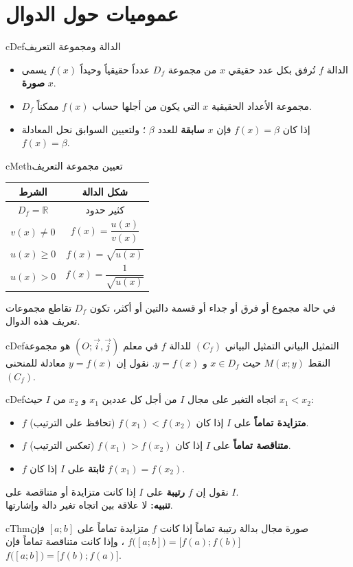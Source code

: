 \documentclass[12pt,a4paper]{article}
\newenvironment{BOX}[2]{\begin{otherlanguage}{english}\begin{arbox}{#1}{#2}}{\end{arbox}\end{otherlanguage}}
\newenvironment{tarif}[1][تعريف]{\begin{BOX}{cDef}{#1}}{\end{BOX}}
\newenvironment{khassia}[1][خاصية]{\begin{BOX}{cThm}{#1}}{\end{BOX}}
\newenvironment{tariqa}[1][طريقة]{\begin{BOX}{cMeth}{#1}}{\end{BOX}}
\newcommand{\R}{\mathbb{R}}
\begin{document}
\section{عموميات حول الدوال}
\begin{tarif}[الدالة ومجموعة التعريف]
\begin{itemize}
\item الدالة $f$ تُرفق بكل عدد حقيقي $x$ من مجموعة $D_f$ عدداً حقيقياً وحيداً $f(x)$ يسمى \textbf{صورة} $x$.
\item $D_f$ مجموعة الأعداد الحقيقية $x$ التي يكون من أجلها حساب $f(x)$ ممكناً.
\item إذا كان $f(x)=\beta$ فإن $x$ \textbf{سابقة} للعدد $\beta$ ؛ ولتعيين السوابق نحل المعادلة $f(x)=\beta$.
\end{itemize}
\end{tarif}
\begin{tariqa}[تعيين مجموعة التعريف]
\begin{center}
\renewcommand{\arraystretch}{1.6}
\begin{tabular}{|C|C|}\hline
\textbf{الشرط} & \textbf{شكل الدالة}\\\hline
$D_f=\R$ & كثير حدود\\\hline
$v(x)\neq0$ & $f(x)=\dfrac{u(x)}{v(x)}$\\\hline
$u(x)\ge0$ & $f(x)=\sqrt{u(x)}$\\\hline
$u(x)>0$ & $f(x)=\dfrac{1}{\sqrt{u(x)}}$\\\hline
\end{tabular}
\end{center}
في حالة مجموع أو فرق أو جداء أو قسمة دالتين أو أكثر، تكون $D_f$ تقاطع مجموعات تعريف هذه الدوال.
\end{tariqa}
\begin{tarif}[التمثيل البياني]
التمثيل البياني $(C_f)$ للدالة $f$ في معلم $\left(O;\vec i,\vec j\right)$ هو مجموعة النقط $M(x;y)$ حيث $x\in D_f$ و $y=f(x)$.
نقول إن $y=f(x)$ معادلة للمنحنى $(C_f)$.
\end{tarif}
\begin{tarif}[اتجاه التغير على مجال $I$]
من أجل كل عددين $x_1$ و $x_2$ من $I$ حيث $x_1<x_2$:
\begin{itemize}
\item $f$ \textbf{متزايدة تماماً} على $I$ إذا كان $f(x_1)<f(x_2)$ (تحافظ على الترتيب).
\item $f$ \textbf{متناقصة تماماً} على $I$ إذا كان $f(x_1)>f(x_2)$ (تعكس الترتيب).
\item $f$ \textbf{ثابتة} على $I$ إذا كان $f(x_1)=f(x_2)$.
\end{itemize}
نقول إن $f$ \textbf{رتيبة} على $I$ إذا كانت متزايدة أو متناقصة على $I$.\\
\textbf{تنبيه:} لا علاقة بين اتجاه تغير دالة وإشارتها.
\end{tarif}
\begin{khassia}[صورة مجال بدالة رتيبة تماماً]
إذا كانت $f$ متزايدة تماماً على $[a;b]$ فإن $f\big([a;b]\big)=\big[f(a);f(b)\big]$ ،
وإذا كانت متناقصة تماماً فإن $f\big([a;b]\big)=\big[f(b);f(a)\big]$.
\end{khassia}
\end{document}
